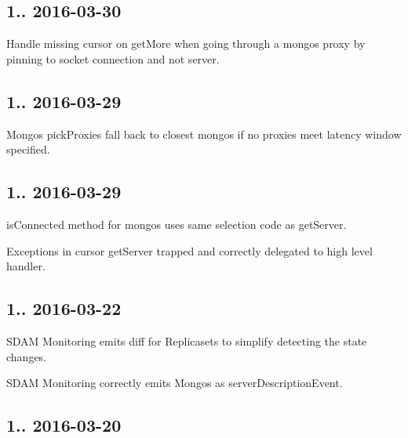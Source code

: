 \subsection*{1.. 2016-\/03-\/30 }


\begin{DoxyItemize}
\item Handle missing cursor on get\+More when going through a mongos proxy by pinning to socket connection and not server.
\end{DoxyItemize}

\subsection*{1.. 2016-\/03-\/29 }


\begin{DoxyItemize}
\item Mongos pick\+Proxies fall back to closest mongos if no proxies meet latency window specified.
\end{DoxyItemize}

\subsection*{1.. 2016-\/03-\/29 }


\begin{DoxyItemize}
\item is\+Connected method for mongos uses same selection code as get\+Server.
\item Exceptions in cursor get\+Server trapped and correctly delegated to high level handler.
\end{DoxyItemize}

\subsection*{1.. 2016-\/03-\/22 }


\begin{DoxyItemize}
\item S\+D\+AM Monitoring emits diff for Replicasets to simplify detecting the state changes.
\item S\+D\+AM Monitoring correctly emits Mongos as server\+Description\+Event.
\end{DoxyItemize}

\subsection*{1.. 2016-\/03-\/20 }


